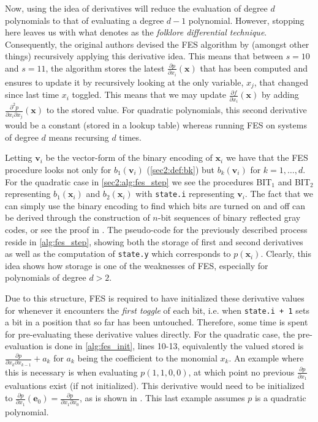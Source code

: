 Now, using the idea of derivatives will reduce the evaluation of degree $d$ polynomials to that of evaluating a degree $d-1$ polynomial. However, stopping here leaves us with what \cite{cryptoeprint:2010/313} denotes as the \textit{folklore differential technique}. Consequently, the original authors devised the FES algorithm by (amongst other things) recursively applying this derivative idea. This means that between $s = 10$ and $s = 11$, the algorithm stores the latest $\frac{\partial p}{\partial x_i}(\mathbf{x})$ that has been computed and ensures to update it by recursively looking at the only variable, $x_j$, that changed since last time $x_i$ toggled. This means that we may update $\frac{\partial f}{\partial x_i}(\mathbf{x})$ by adding $\frac{\partial^2 p}{\partial x_i \partial x_j}(\mathbf{x})$ to the stored value. For quadratic polynomials, this second derivative would be a constant (stored in a lookup table) whereas running FES on systems of degree $d$ means recursing $d$ times. 

Letting $\mathbf{v}_i$ be the vector-form of the binary encoding of $\mathbf{x}_i$ we have that the FES procedure looks not only for $b_1(\mathbf{v}_i)$ (\cref{sec2:def:bk}) but $b_k(\mathbf{v}_i)$ for $k=1,\dots,d$. For the quadratic case in \cref{sec2:alg:fes_step} we see the procedures BIT$_1$ and BIT$_2$ representing $b_1(\mathbf{x}_i)$ and $b_2(\mathbf{x}_i)$ with \texttt{state.i} representing $\mathbf{v}_i$. The fact that we can simply use the binary encoding to find which bits are turned on and off can be derived through the construction of $n$-bit sequences of binary reflected gray codes, or see the proof in \cite{tungchoumasters}. The pseudo-code for the previously described process reside in \cref{alg:fes_step}, showing both the storage of first and second derivatives as well as the computation of \texttt{state.y} which corresponds to $p(\mathbf{x}_i)$. Clearly, this idea shows how storage is one of the weaknesses of FES, especially for polynomials of degree $d > 2$. 

Due to this structure, FES is required to have initialized these derivative values for whenever it encounters the \textit{first toggle} of each bit, i.e. when \texttt{state.i + 1} sets a bit in a position that so far has been untouched. Therefore, some time is spent for pre-evaluating these derivative values directly. For the quadratic case, the pre-evaluation is done in \cref{alg:fes_init}, lines 10-13, equivalently the valued stored is $\frac{\partial p}{\partial x_k \partial x_{k-1}} + a_k$ for $a_k$ being the coefficient to the monomial $x_k$. An example where this is necessary is when evaluating $p(1,1,0,0)$, at which point no previous $\frac{\partial p}{\partial x_1}$ evaluations exist (if not initialized). This derivative would need to be initialized to $\frac{\partial p}{\partial x_1}(\mathbf{e}_0) = \frac{\partial p}{\partial x_1 \partial x_0}$, as is shown in \cite{tungchoumasters}. This last example assumes $p$ is a quadratic polynomial.

